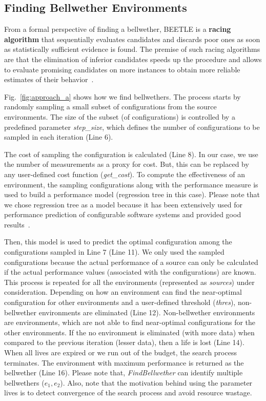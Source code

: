\documentclass[10pt,journal,compsoc]{IEEEtran}
\begin{document}
\subsection{Finding Bellwether Environments}\label{subsec:finding}

From a formal perspective of finding a bellwether, BEETLE     is a  {\bf racing algorithm} that sequentially evaluates candidates and discards poor ones as soon as statistically sufficient evidence is found. The premise of such racing
algorithms are that the elimination of inferior candidates speeds up the procedure and allows to evaluate promising candidates on more instances to obtain more reliable estimates of their behavior~\cite{birattari2002racing}.

Fig.~\ref{fig:approach_a} shows how we find  bellwethers. The process starts by randomly sampling a small subset of configurations from the source environments. The size of the subset (of configurations) is controlled by a predefined parameter \textit{step\_size}, which defines the number of configurations to be sampled in each iteration (Line 6). 

The cost of sampling the configuration is calculated (Line 8). In our case, we use the number of measurements as a proxy for cost. But, this can be replaced by any user-defined cost function (\textit{get\_cost}). To compute the effectiveness of an environment, the sampling configurations along with the performance measure is used to build a performance model (regression tree in this case). Please note that we chose regression tree as a model because it has been extensively used for performance prediction of configurable
software systems and provided good results~\cite{guo2013variability, sarkar2015cost, nair2017faster, nair2017using, nair2018finding, guo2017data, valov2017transferring}. 

Then, this model is used to predict the optimal configuration among the configurations sampled in Line 7 (Line 11). We only used the sampled configurations because the actual performance of a source can only be calculated if the actual performance values (associated with the configurations) are known. This process is repeated for all the environments (represented as \textit{sources}) under consideration. Depending on how an environment can find the near-optimal configuration for other environments and a user-defined threshold (\textit{thres}), non-bellwether environments are eliminated (Line 12). Non-bellwether environments are environments, which are not able to find near-optimal configurations for the other environments.  If the no environment is eliminated (with more
data) when compared to the previous iteration
(lesser data), then a life is lost (Line 14). When all lives are
expired or we run out of the budget, the search process terminates. The environment with maximum performance is returned as the bellwether (Line 16). Please note that, \textit{FindBellwether} can identify multiple bellwethers ($e_1, e_2$). Also, note that the motivation behind using the parameter lives is to detect
convergence of the search process and avoid resource wastage.
\end{document}
